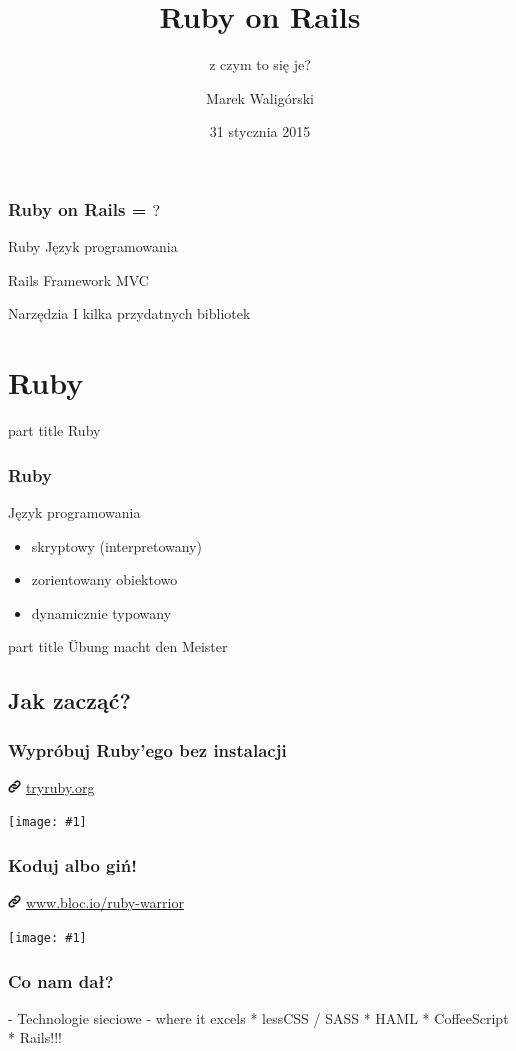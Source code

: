 \documentclass{beamer}
\title{Ruby on Rails}
\subtitle{z czym to się je?}
\author{Marek Waligórski}
\date{31 stycznia 2015}
\institute{InfoMEET Poznań}
\newcommand{\myfullimage}[1]{%
    \hspace*{-1.1cm}
    \texttt{[image: \#1]}
}
\newcommand{\myurl}[1]{%
    \begin{block}{}
       \centering \huge
       \includegraphics[width=0.35cm]{link.png}
       \hspace{0.1cm}
       \url{#1}
    \end{block}
}
\newcommand{\mytitle}[1]{%
    \begin{frame}[plain]
        \begin{centering}
        \vspace{1em}\par
            \begin{beamercolorbox}[rounded=true,sep=4pt,center]{part title}
               \huge #1
            \end{beamercolorbox}
        \end{centering}
    \end{frame}
}
\newcommand{\mysection}[1]{%
    \section{#1}
    \mytitle{#1}
}
\begin{document}
\begin{frame}[plain]
\titlepage
\end{frame}

\begin{frame}[plain]
\frametitle{Ruby on Rails = $?$}
\begin{block}{Ruby}
    Język programowania
\end{block}
\begin{block}{Rails}
    Framework MVC
\end{block}
\begin{block}{Narzędzia}
    I kilka przydatnych bibliotek
\end{block}
\end{frame}

\mysection{Ruby}

\begin{frame}[fragile]\frametitle{Ruby}
    \begin{block}{Język programowania}
    \begin{itemize}
        \item skryptowy (interpretowany)
        \item zorientowany obiektowo
        \item dynamicznie typowany
    \end{itemize}
    \end{block}
\end{frame}

\mytitle{\centering \huge \color{orange} Übung macht den Meister \par}

\subsection{Jak zacząć?}
\begin{frame}[fragile]
\frametitle{Wypróbuj Ruby'ego bez instalacji}
    \myurl{tryruby.org}
    \myfullimage{tryruby.png}
\end{frame}
\begin{frame}[fragile]
\frametitle{Koduj albo giń!}
    \myurl{www.bloc.io/ruby-warrior}
    \myfullimage{rubywarrior.png}
\end{frame}



\begin{frame}[fragile]
\frametitle{Co nam dał?}

- Technologie sieciowe - where it excels
* lessCSS / SASS
* HAML
* CoffeeScript
* Rails!!!
\end{frame}
\end{document}
